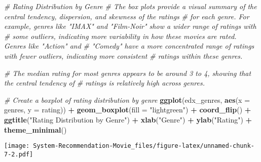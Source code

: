 \documentclass[
]{article}
\newenvironment{Shaded}{\begin{snugshade}}{\end{snugshade}}
\newcommand{\AttributeTok}[1]{\textcolor[rgb]{0.13,0.29,0.53}{#1}}
\newcommand{\CommentTok}[1]{\textcolor[rgb]{0.56,0.35,0.01}{\textit{#1}}}
\newcommand{\FunctionTok}[1]{\textcolor[rgb]{0.13,0.29,0.53}{\textbf{#1}}}
\newcommand{\NormalTok}[1]{#1}
\newcommand{\SpecialCharTok}[1]{\textcolor[rgb]{0.81,0.36,0.00}{\textbf{#1}}}
\newcommand{\StringTok}[1]{\textcolor[rgb]{0.31,0.60,0.02}{#1}}
\begin{document}
\begin{Shaded}
\begin{Highlighting}[]
\CommentTok{\# Rating Distribution by Genre}
\CommentTok{\# The box plots provide a visual summary of the central tendency, dispersion, and skewness of the ratings }
\CommentTok{\# for each genre. For example, genres like "IMAX" and "Film{-}Noir" show a wider range of ratings with}
\CommentTok{\# some outliers, indicating more variability in how these movies are rated. Genres like "Action" and }
\CommentTok{\# "Comedy" have a more concentrated range of ratings with fewer outliers, indicating more consistent }
\CommentTok{\# ratings within these genres.}

\CommentTok{\# The median rating for most genres appears to be around 3 to 4, showing that the central tendency of }
\CommentTok{\# ratings is relatively high across genres.}

\CommentTok{\# Create a boxplot of rating distribution by genre}
\FunctionTok{ggplot}\NormalTok{(edx\_genres, }\FunctionTok{aes}\NormalTok{(}\AttributeTok{x =}\NormalTok{ genres, }\AttributeTok{y =}\NormalTok{ rating)) }\SpecialCharTok{+}
  \FunctionTok{geom\_boxplot}\NormalTok{(}\AttributeTok{fill =} \StringTok{"lightgreen"}\NormalTok{) }\SpecialCharTok{+}
  \FunctionTok{coord\_flip}\NormalTok{() }\SpecialCharTok{+}
  \FunctionTok{ggtitle}\NormalTok{(}\StringTok{"Rating Distribution by Genre"}\NormalTok{) }\SpecialCharTok{+}
  \FunctionTok{xlab}\NormalTok{(}\StringTok{"Genre"}\NormalTok{) }\SpecialCharTok{+}
  \FunctionTok{ylab}\NormalTok{(}\StringTok{"Rating"}\NormalTok{) }\SpecialCharTok{+}
  \FunctionTok{theme\_minimal}\NormalTok{()}
\end{Highlighting}
\end{Shaded}

\texttt{[image: System-Recommendation-Movie\_files/figure-latex/unnamed-chunk-7-2.pdf]}
\end{document}
